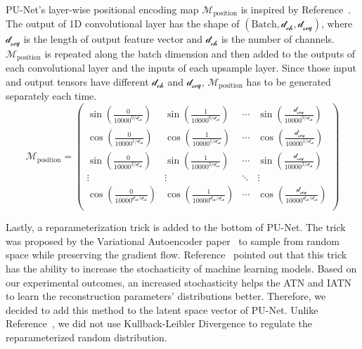 PU-Net's layer-wise positional encoding map $\mathcal{M}_{\mathrm{position}}$ is inspired by Reference~\cite{Transformer}. The output of 1D convolutional layer has the shape of $(\mathrm{Batch},\mathcal{d}_{\mathcal{ch}}, \mathcal{d}_{\mathcal{seq}})$, where $\mathcal{d}_{\mathcal{seq}}$ is the length of output feature vector and $\mathcal{d}_{\mathcal{ch}}$ is the number of channels. $\mathcal{M}_{\mathrm{position}}$ is repeated along the batch dimension and then added to the outputs of each convolutional layer and the inputs of each upsample layer. Since those input and output tensors have different $\mathcal{d}_{\mathcal{ch}}$ and $\mathcal{d}_{\mathcal{seq}}$, $\mathcal{M}_{\mathrm{position}}$ has to be generated separately each time.
\begin{equation}
\mathcal{M}_{\mathrm{position}}=
\begin{pmatrix}
\sin(\frac{0}{10000^{0/\mathcal{d}_{\mathcal{ch}}}}) &\sin(\frac{1}{10000^{0/\mathcal{d}_{\mathcal{ch}}}})& \cdots & \sin(\frac{\mathcal{d}_{\mathcal{seq}}}{10000^{0/\mathcal{d}_{\mathcal{ch}}}}) \\
\cos(\frac{0}{10000^{1/\mathcal{d}_{\mathcal{ch}}}}) &\cos(\frac{1}{10000^{1/\mathcal{d}_{\mathcal{ch}}}})& \cdots & \cos(\frac{\mathcal{d}_{\mathcal{seq}}}{10000^{1/\mathcal{d}_{\mathcal{ch}}}}) \\
\sin(\frac{0}{10000^{2 /\mathcal{d}_{\mathcal{ch}}}}) &\sin(\frac{1}{10000^{2/\mathcal{d}_{\mathcal{ch}}}})& \cdots & \sin(\frac{\mathcal{d}_{\mathcal{seq}}}{10000^{2/\mathcal{d}_{\mathcal{ch}}}}) \\
\vdots&\vdots&\ddots&\vdots\\
\cos(\frac{0}{10000^{\mathcal{d}_{\mathcal{ch}}/\mathcal{d}_{\mathcal{ch}}}}) &\cos(\frac{1}{10000^{\mathcal{d}_{\mathcal{ch}}/\mathcal{d}_{\mathcal{ch}}}})& \cdots & \cos(\frac{\mathcal{d}_{\mathcal{seq}}}{10000^{\mathcal{d}_{\mathcal{ch}}/\mathcal{d}_{\mathcal{ch}}}}) \\
\end{pmatrix}
\label{eqn:pos_encoding}
\end{equation}

Lastly, a reparameterization trick is added to the bottom of PU-Net. The trick was proposed by the Variational Autoencoder paper~\cite{VAE} to sample from random space while preserving the gradient flow. Reference~\cite{AAE} pointed out that this trick has the ability to increase the stochasticity of machine learning models. Based on our experimental outcomes, an increased stochasticity helps the ATN and IATN to learn the reconstruction parameters' distributions better. Therefore, we decided to add this method to the latent space vector of PU-Net. Unlike Reference~\cite{VAE}, we did not use  Kullback-Leibler Divergence to regulate the reparameterized random distribution.



